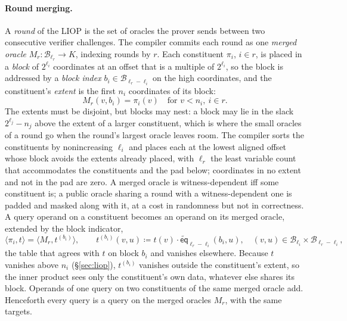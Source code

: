 \documentclass{article}
\theoremstyle{definition}
\newcommand*{\mle}{\widetilde}
\newcommand{\eq}{\mathsf{eq}}
\newcommand{\BB}{\mathcal{B}}
\begin{document}
\paragraph{Round merging.}
A \emph{round} of the LIOP is the set of oracles the prover sends between two consecutive verifier challenges. The compiler commits each round as one \emph{merged oracle} $M_r \colon \BB_{\ell_r} \to K$, indexing rounds by $r$. Each constituent $\pi_i$, $i \in r$, is placed in a \emph{block} of $2^{\ell_i}$ coordinates at an offset that is a multiple of $2^{\ell_i}$, so the block is addressed by a \emph{block index} $b_i \in \BB_{\ell_r - \ell_i}$ on the high coordinates, and the constituent's \emph{extent} is the first $n_i$ coordinates of its block:
\[
  M_r(v, b_i) = \pi_i(v) \quad \text{for } v < n_i,\ i \in r.
\]
The extents must be disjoint, but blocks may nest: a block may lie in the slack $2^{\ell_j} - n_j$ above the extent of a larger constituent, which is where the small oracles of a round go when the round's largest oracle leaves room. The compiler sorts the constituents by nonincreasing $\ell_i$ and places each at the lowest aligned offset whose block avoids the extents already placed, with $\ell_r$ the least variable count that accommodates the constituents and the pad below; coordinates in no extent and not in the pad are zero. A merged oracle is witness-dependent iff some constituent is; a public oracle sharing a round with a witness-dependent one is padded and masked along with it, at a cost in randomness but not in correctness. A query operand on a constituent becomes an operand on its merged oracle, extended by the block indicator,
\[
  \langle \pi_i, t \rangle = \langle M_r, t^{(b_i)} \rangle, \qquad t^{(b_i)}(v, u) \coloneqq t(v) \cdot \mle{\eq}_{\ell_r - \ell_i}(b_i, u), \quad (v, u) \in \BB_{\ell_i} \times \BB_{\ell_r - \ell_i},
\]
the table that agrees with $t$ on block $b_i$ and vanishes elsewhere. Because $t$ vanishes above $n_i$ (\S\ref{sec:liop}), $t^{(b_i)}$ vanishes outside the constituent's extent, so the inner product sees only the constituent's own data, whatever else shares its block. Operands of one query on two constituents of the same merged oracle add. Henceforth every query is a query on the merged oracles $M_r$, with the same targets.
\end{document}
